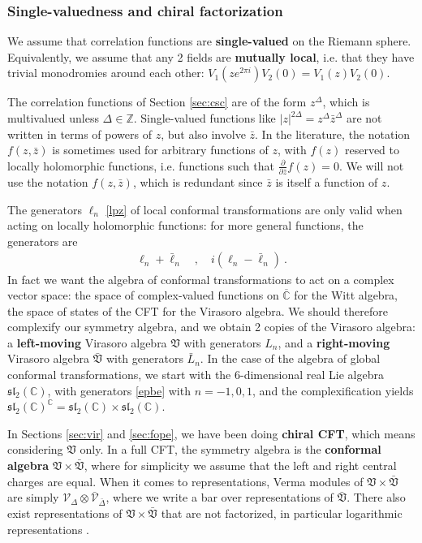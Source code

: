 \documentclass[12pt, a4paper]{article}
\newcommand{\myindex}[1]{\textbf{\boldmath #1}}
\begin{document}
\subsubsection{Single-valuedness and chiral factorization}

We assume that correlation functions are \myindex{single-valued} on the Riemann sphere. Equivalently, we assume that any 2 fields are \myindex{mutually local}, i.e. that they have trivial monodromies around each other: $V_1(ze^{2\pi i})V_2(0)=V_1(z)V_2(0)$. 

The correlation functions of Section \ref{sec:csc} are of the form $z^\Delta$, which is multivalued unless $\Delta\in\mathbb{Z}$. Single-valued functions like $|z|^{2\Delta}=z^\Delta\bar{z}^\Delta$ are not written in terms of powers of $z$, but also involve $\bar z$. In the literature, the notation $f(z,\bar z)$ is sometimes used for arbitrary functions of $z$, with $f(z)$ reserved to locally holomorphic functions, i.e. functions such that $\frac{\partial}{\partial \bar z} f(z) =0$. We will not use the notation $f(z,\bar z)$, which is redundant since $\bar z$ is itself a function of $z$. 

The generators $\ell_n$ \eqref{lpz} of local conformal transformations are only valid when acting on locally holomorphic functions: for more general functions, the generators are 
\begin{align}
 \ell_n +\bar{\ell}_n \quad , \quad i(\ell_n -\bar \ell_n)\  .
 \label{epbe}
\end{align}
In fact we want the algebra of conformal transformations to act on a complex vector space: the space of complex-valued functions on $\overline{\mathbb{C}}$ for the Witt algebra, the space of states of the CFT for the Virasoro algebra. We should therefore complexify our symmetry algebra, and we obtain 2 copies of the Virasoro algebra: a \myindex{left-moving}  Virasoro algebra $\mathfrak{V}$ with generators $L_n$, and a \myindex{right-moving} Virasoro algebra $\bar{\mathfrak{V}}$ with generators $\bar{L}_n$. In the case of the algebra of global conformal transformations, we start with the 6-dimensional real Lie algebra $\mathfrak{sl}_2(\mathbb{C})$, with generators \eqref{epbe} with $n=-1,0,1$, and the complexification yields $\mathfrak{sl}_2(\mathbb{C})^\mathbb{C} = \mathfrak{sl}_2(\mathbb{C})\times \mathfrak{sl}_2(\mathbb{C})$.

In Sections \ref{sec:vir} and \ref{sec:fope}, we have been doing \myindex{chiral CFT}, which means considering $\mathfrak{V}$ only. In a full CFT, the symmetry algebra is the \myindex{conformal algebra} $\mathfrak{V}\times \bar{\mathfrak{V}}$, where for simplicity we assume that the left and right central charges are equal. When it comes to representations, Verma modules of $\mathfrak{V}\times \bar{\mathfrak{V}}$ are simply $\mathcal{V}_\Delta\otimes \bar{\mathcal{V}}_{\bar \Delta}$, where we write a bar over representations of $\bar{\mathfrak{V}}$. There also exist representations of $\mathfrak{V}\times \bar{\mathfrak{V}}$ that are not factorized, in particular logarithmic representations \cite{nr20}. 
\end{document}

